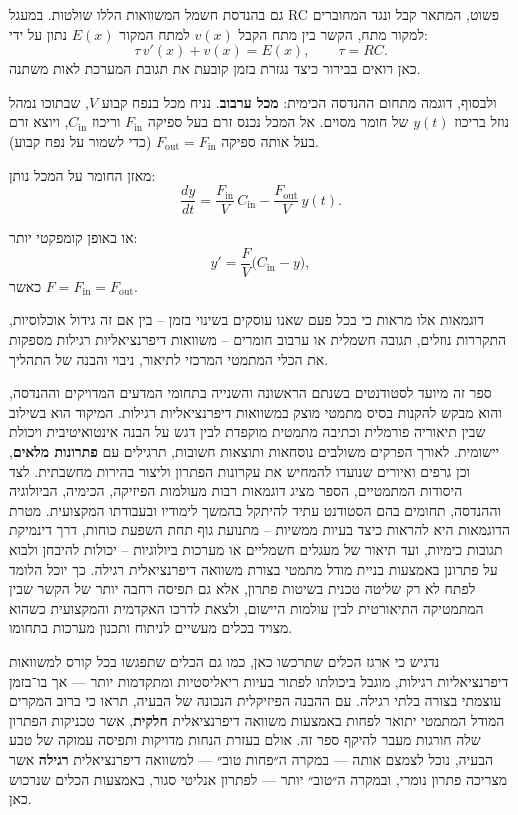 \documentclass{article}
\numberwithin{equation}{section}
\begin{document}
גם בהנדסת חשמל המשוואות הללו שולטות. במעגל RC פשוט, המתאר קבל ונגד המחוברים למקור מתח, הקשר בין מתח הקבל $v(x)$ למתח המקור $E(x)$ נתון על ידי:
\[
\tau\, v'(x) + v(x) = E(x), \qquad \tau = RC.
\]
כאן רואים בבירור כיצד נגזרת בזמן קובעת את תגובת המערכת לאות משתנה.

ולבסוף, דוגמה מתחום ההנדסה הכימית: \textbf{מכל ערבוב}.  
נניח מכל בנפח קבוע $V$, שבתוכו נמהל נוזל בריכוז $y(t)$ של חומר מסוים.  
אל המכל נכנס זרם בעל ספיקה $F_{\text{in}}$ וריכוז $C_{\text{in}}$, ויוצא זרם בעל אותה ספיקה $F_{\text{out}}=F_{\text{in}}$ (כדי לשמור על נפח קבוע).  

מאזן החומר על המכל נותן:
\[
\frac{dy}{dt} = \frac{F_{\text{in}}}{V}\,C_{\text{in}}
              - \frac{F_{\text{out}}}{V}\,y(t).
\]

או באופן קומפקטי יותר:
\[
y' = \frac{F}{V}\big(C_{\text{in}} - y\big),
\]
כאשר $F=F_{\text{in}}=F_{\text{out}}$.

דוגמאות אלו מראות כי בכל פעם שאנו עוסקים בשינוי בזמן – בין אם זה גידול אוכלוסיות, התקררות נוזלים, תגובה חשמלית או ערבוב חומרים – משוואות דיפרנציאליות רגילות מספקות את הכלי המתמטי המרכזי לתיאור, ניבוי והבנה של התהליך.

ספר זה מיועד לסטודנטים בשנתם הראשונה והשנייה בתחומי המדעים המדויקים וההנדסה, והוא מבקש להקנות בסיס מתמטי מוצק במשוואות דיפרנציאליות רגילות. המיקוד הוא בשילוב שבין תיאוריה פורמלית וכתיבה מתמטית מוקפדת לבין דגש על הבנה אינטואיטיבית ויכולת יישומית. לאורך הפרקים משולבים נוסחאות ותוצאות חשובות, תרגילים עם \textbf{פתרונות מלאים}, וכן גרפים ואיורים שנועדו להמחיש את עקרונות הפתרון וליצור בהירות מחשבתית. לצד היסודות המתמטיים, הספר מציג דוגמאות רבות מעולמות הפיזיקה, הכימיה, הביולוגיה וההנדסה, תחומים בהם הסטודנט עתיד להיתקל בהמשך לימודיו ובעבודתו המקצועית. מטרת הדוגמאות היא להראות כיצד בעיות ממשיות – מתנועת גוף תחת השפעת כוחות, דרך דינמיקת תגובות כימיות, ועד תיאור של מעגלים חשמליים או מערכות ביולוגיות – יכולות להיבחן ולבוא על פתרונן באמצעות בניית מודל מתמטי בצורת משוואה דיפרנציאלית רגילה. כך יוכל הלומד לפתח לא רק שליטה טכנית בשיטות פתרון, אלא גם תפיסה רחבה יותר של הקשר שבין המתמטיקה התיאורטית לבין עולמות היישום, ולצאת לדרכו האקדמית והמקצועית כשהוא מצויד בכלים מעשיים לניתוח ותכנון מערכות בתחומו.

נדגיש כי ארגז הכלים שתרכשו כאן, כמו גם הכלים שתפגשו בכל קורס למשוואות דיפרנציאליות רגילות,  
מוגבל ביכולתו לפתור בעיות ריאליסטיות ומתקדמות יותר — אך בו־בזמן עוצמתי בצורה בלתי רגילה.  
עם ההבנה הפיזיקלית הנכונה של הבעיה, תראו כי ברוב המקרים המודל המתמטי יתואר לפחות באמצעות משוואה דיפרנציאלית \textbf{חלקית},  
אשר טכניקות הפתרון שלה חורגות מעבר להיקף ספר זה.  
אולם בעזרת הנחות מדויקות ותפיסה עמוקה של טבע הבעיה, נוכל לצמצם אותה — במקרה ה״פחות טוב״ —  
למשוואה דיפרנציאלית \textbf{רגילה} אשר מצריכה פתרון נומרי, ובמקרה ה״טוב״ יותר —  
לפתרון אנליטי סגור, באמצעות הכלים שנרכוש כאן.
\end{document}
